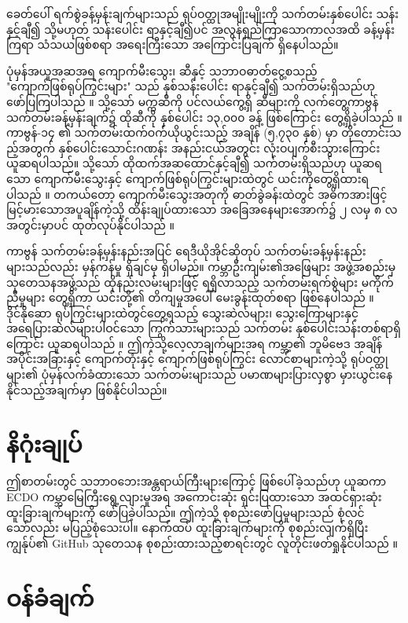 \documentclass[10pt,twocolumn,letterpaper]{article}
\begin{document}
ခေတ်ပေါ် ရက်စွဲခန့်မှန်းချက်များသည် ရုပ်ဝတ္ထုအမျိုးမျိုးကို သက်တမ်းနှစ်ပေါင်း သန်းနှင့်ချီ၍ သို့မဟုတ် သန်းပေါင်း ရာနှင့်ချီ၍ပင် အလွန်ရှည်ကြာသောကာလအထိ ခန့်မှန်းကြရာ သံသယဖြစ်စရာ အရေးကြီးသော အကြောင်းပြချက် ရှိနေပါသည်။

ပုံမှန်အယူအဆအရ ကျောက်မီးသွေး၊ ဆီနှင့် သဘာဝဓာတ်ငွေ့စသည့် "ကျောက်ဖြစ်ရုပ်ကြွင်းများ" သည် နှစ်သန်းပေါင်း ရာနှင့်ချီ၍ သက်တမ်းရှိသည်ဟု ဖော်ပြကြပါသည် \cite{104}။ သို့သော် မက္ကဆီကို ပင်လယ်ကွေ့ရှိ ဆီများကို လက်တွေ့ကာဗွန် သက်တမ်းခန့်မှန်းချက်၌ ထိုဆီကို နှစ်ပေါင်း ၁၃,၀၀၀ ခန့် ဖြစ်ကြောင်း တွေ့ရှိခဲ့ပါသည် \cite{105}။ ကာဗွန်-၁၄ ၏ သက်တမ်းထက်ဝက်ယိုယွင်းသည့် အချိန် (၅,၇၃၀ နှစ်) မှာ တိုတောင်းသည့်အတွက် နှစ်ပေါင်းသောင်းဂဏန်း အနည်းငယ်အတွင်း လုံးဝပျက်စီးသွားကြောင်း ယူဆရပါသည်။ သို့သော် ထိုထက်အဆထောင်နှင့်ချီ၍ သက်တမ်းရှိသည်ဟု ယူဆရသော ကျောက်မီးသွေးနှင့် ကျောက်ဖြစ်ရုပ်ကြွင်းများထဲတွင် ယင်းကိုတွေ့ရှိထားရပါသည် \cite{106}။ တကယ်တော့ ကျောက်မီးသွေးအတုကို ဓာတ်ခွဲခန်းထဲတွင် အဓိကအားဖြင့် မြင့်မားသောအပူချိန်ကဲ့သို့ ထိန်းချုပ်ထားသော အခြေအနေများအောက်၌ ၂ လမှ ၈ လအတွင်းမှာပင် ထုတ်လုပ်နိုင်ပါသည် \cite{107}။

ကာဗွန် သက်တမ်းခန့်မှန်းနည်းအပြင် ရေဒီယိုအိုင်ဆိုတုပ် သက်တမ်းခန့်မှန်းနည်းများသည်လည်း မှန်ကန်မှု ရှိချင်မှ ရှိပါမည်။ ကမ္ဘာဦးကျမ်း၏အဖြေများ အဖွဲ့အစည်းမှ သုတေသနအဖွဲ့သည် ထိုနည်းလမ်းများဖြင့် ရရှိလာသည့် သက်တမ်းရက်စွဲများ မကိုက်ညီမှုများ တွေ့ရှိကာ ယင်းတို့၏ တိကျမှုအပေါ် မေးခွန်းထုတ်စရာ ဖြစ်နေပါသည် \cite{108}။ ဒိုင်နိုဆော ရုပ်ကြွင်းများထဲတွင်တွေ့ရသည့် သွေးဆဲလ်များ၊ သွေးကြောများနှင့် အရေပြားဆဲလ်များပါဝင်သော ကြွက်သားများသည် သက်တမ်း နှစ်ပေါင်းသန်းတစ်ရာရှိကြောင်း ယူဆရပါသည် \cite{109,110}။ ဤကဲ့သို့လေ့လာချက်များအရ ကမ္ဘာ့၏ ဘူမိဗေဒ အချိန်အပိုင်းအခြားနှင့် ကျောက်တုံးနှင့် ကျောက်ဖြစ်ရုပ်ကြွင်း လောင်စာများကဲ့သို့ ရုပ်ဝတ္ထုများ၏ ပုံမှန်လက်ခံထားသော သက်တမ်းများသည် ပမာဏများပြားလှစွာ မှားယွင်းနေနိုင်သည့်အချက်မှာ ဖြစ်နိုင်ပါသည်။

\section{နိဂုံးချုပ်}

ဤစာတမ်းတွင် သဘာဝဘေးအန္တရာယ်ကြီးများကြောင့် ဖြစ်ပေါ်ခဲ့သည်ဟု ယူဆကာ ECDO ကမ္ဘာမြေကြီးရွေ့လျားမှုအရ အကောင်းဆုံး ရှင်းပြထားသော အထင်ရှားဆုံး ထူးခြားချက်များကို ဖော်ပြခဲ့ပါသည်။ ဤကဲ့သို့ စုစည်းဖော်ပြမှုများသည် စုံလင်သော်လည်း မပြည့်စုံသေးပါ။ နောက်ထပ် ထူးခြားချက်များကို စုစည်းလျက်ရှိပြီး ကျွန်ုပ်၏ GitHub သုတေသန စုစည်းထားသည့်စာရင်းတွင် လူတိုင်းဖတ်ရှုနိုင်ပါသည် \cite{2}။

\section{ဝန်ခံချက်}
\end{document}
